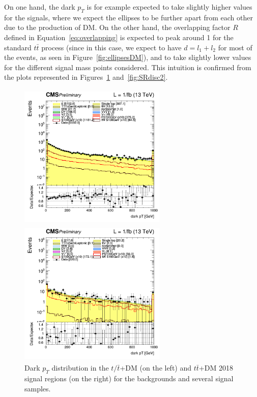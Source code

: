 \documentclass[a4paper, 10pt, openright]{report}
\begin{document}
On one hand, the dark $p_T$ is for example expected to take slightly higher values for the signals, where we expect the ellipses to be further apart from each other due to the production of \ac{DM}. On the other hand, the overlapping factor $R$ defined in Equation~\ref{eq:overlapping} is expected to peak around 1 for the standard $t \bar t$ process (since in this case, we expect to have $d = l_1 + l_2$ for most of the events, as seen in Figure~\ref{fig:ellipsesDM}), and to take slightly lower values for the different signal mass points considered. This intuition is confirmed from the plots represented in Figures~\ref{fig:SRdisc1} and~\ref{fig:SRdisc2}.

\begin{figure}[htbp]
\centering
\begin{minipage}[b]{.48\textwidth}
\includegraphics[width=7cm, height=7cm]{figs/log_cratio_topCR_ll_2j_signal1_dark_pt.png}
\end{minipage}\hfill
\begin{minipage}[b]{.48\textwidth}
\includegraphics[width=7cm, height=7cm]{figs/log_cratio_topCR_ll_2j_signal0_dark_pt.png}
\end{minipage} \hfill
\caption{Dark $p_T$ distribution in the $t/ \bar t$+DM (on the left) and $t \bar t$+DM 2018 signal regions (on the right) for the backgrounds and several signal samples.}
\label{fig:SRdisc1}
\end{figure}
\end{document}
